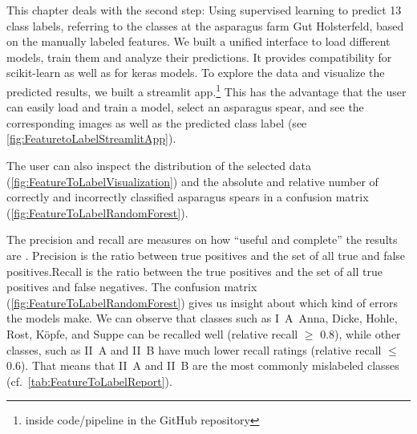 \bigskip
This chapter deals with the second step: Using supervised learning to predict 13 class labels, referring to the classes at the asparagus farm Gut Holsterfeld, based on the manually labeled features. We built a unified interface to load different models, train them and analyze their predictions. It provides compatibility for scikit-learn as well as for keras models. To explore the data and visualize the predicted results, we built a streamlit app.\footnote{inside code/pipeline in the GitHub repository} This has the advantage that the user can easily load and train a model, select an asparagus spear, and see the corresponding images as well as the predicted class label (see \autoref{fig:FeaturetoLabelStreamlitApp}).

The user can also inspect the distribution of the selected data (\autoref{fig:FeatureToLabelVisualization}) and the absolute and relative number of correctly and incorrectly classified asparagus spears in a confusion matrix (\autoref{fig:FeatureToLabelRandomForest}).

The precision and recall are measures on how \enquote{useful and complete} the results are \citep{wiki:precisionrecall}. Precision is the ratio between true positives and the set of all true and false positives.Recall is the ratio between the true positives and the set of all true positives and false negatives. The confusion matrix (\autoref{fig:FeatureToLabelRandomForest}) gives us insight about which kind of errors the models make. We can observe that classes such as I~A~Anna, Dicke, Hohle, Rost, Köpfe, and Suppe can be recalled well (relative recall $\geq$ 0.8), while other classes, such as II~A and II~B have much lower recall ratings (relative recall $\leq$ 0.6). That means that II~A and II~B are the most commonly mislabeled classes (cf.~\autoref{tab:FeatureToLabelReport}).

